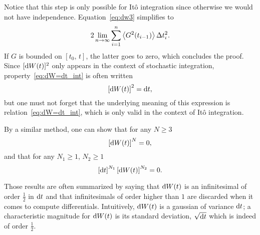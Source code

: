 Notice that this step is only possible for Itô integration since otherwise we would not have independence. Equation~\eqref{eq:dw3} simplifies to
\begin{equation}
	2 \lim_{n\rightarrow\infty} \sum_{i=1}^n \esp{G^2(t_{i-1})}\Delta t_i^2.
\end{equation}
If $G$ is bounded on $[t_0,\,t]$, the latter goes to zero, which concludes the proof. Since $[\rm dW(t)]^2$ only appears in the context of stochastic integration, property~\eqref{eq:dW=dt_int} is often written
\begin{equation} \label{eq:dw2=dt}
	\left[\rm dW(t)\right]^2 = \rm dt,  	
\end{equation}  
but one must not forget that the underlying meaning of this expression is relation~\eqref{eq:dW=dt_int}, which is only valid in the context of Itô integration.

By a similar method, one can show that for any $N \ge 3$
\begin{equation}
	\left[\rm dW(t)\right]^{N} = 0,
\end{equation}
and that for any $N_1 \ge 1$, $N_2 \ge 1$
\begin{equation} \label{eq:dwdt=0}
	\left[\rm dt\right]^{N_1}\left[\rm dW(t)\right]^{N_2} = 0. 
\end{equation}

Those results are often summarized by saying that $\rm dW(t)$ is an infinitesimal of order $\frac{1}{2}$ in $\rm dt$ and that infinitesimals of order higher than $1$ are discarded when it comes to compute differentials. Intuitively, $\rm dW(t)$ is a gaussian of variance $\rm dt$; a characteristic magnitude for $\rm dW(t)$ is its standard deviation, $\sqrt{\rm dt}$ which is indeed of order $\frac{1}{2}$.

